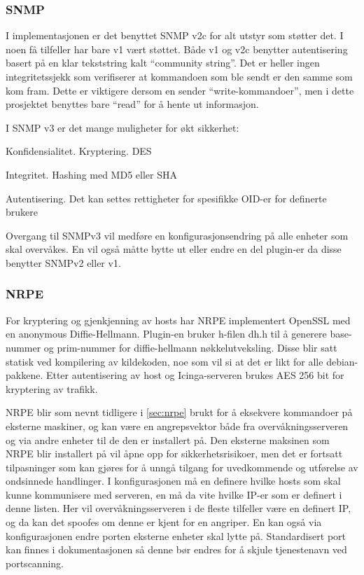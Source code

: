 \subsubsection{SNMP}
I implementasjonen er det benyttet SNMP v2c for alt utstyr som støtter det. I noen få tilfeller har bare v1 vært støttet. Både v1 og v2c benytter autentisering basert på en klar tekststring kalt ``community string''. Det er heller ingen integritetssjekk som verifiserer at kommandoen som ble sendt er den samme som kom fram. Dette er viktigere dersom en sender ``write-kommandoer'', men i dette prosjektet benyttes bare ``read'' for å hente ut informasjon.

I SNMP v3 er det mange muligheter for økt sikkerhet:
\begin{itemize*}
	\item Konfidensialitet. Kryptering. DES
	\item Integritet. Hashing med MD5 eller SHA
	\item Autentisering. Det kan settes rettigheter for spesifikke OID-er for definerte brukere
\end{itemize*}
Overgang til SNMPv3 vil medføre en konfigurasjonsendring på alle enheter som skal overvåkes. En vil også måtte bytte ut eller endre en del plugin-er da disse benytter SNMPv2 eller v1.
\subsubsection{NRPE}
For kryptering og gjenkjenning av hosts har NRPE implementert OpenSSL med en anonymous Diffie-Hellmann. Plugin-en bruker h-filen dh.h til å generere base-nummer og prim-nummer for diffie-hellmann nøkkelutveksling. Disse blir satt statisk ved kompilering av kildekoden, noe som vil si at det er likt for alle debian-pakkene. Etter autentisering av host og Icinga-serveren brukes AES 256 bit for kryptering av trafikk\cite{nrpessl}.

NRPE blir som nevnt tidligere i \ref{sec:nrpe} brukt for å eksekvere kommandoer på eksterne maskiner, og kan være en angrepsvektor både fra overvåkningsserveren og via andre enheter til de den er installert på. Den eksterne maksinen som NRPE blir installert på vil åpne opp for sikkerhetsrisikoer, men det er fortsatt tilpasninger som kan gjøres for å unngå tilgang for uvedkommende og utførelse av ondsinnede handlinger. I konfigurasjonen må en definere hvilke hosts som skal kunne kommunisere med serveren, en må da vite hvilke IP-er som er definert i denne listen. Her vil overvåkningsserveren  i de fleste tilfeller være en definert IP, og da kan det spoofes om denne er kjent for en angriper. En kan også via konfigurasjonen endre porten eksterne enheter skal lytte på. Standardisert port kan finnes i dokumentasjonen så denne bør endres for å skjule tjenestenavn ved portscanning.

